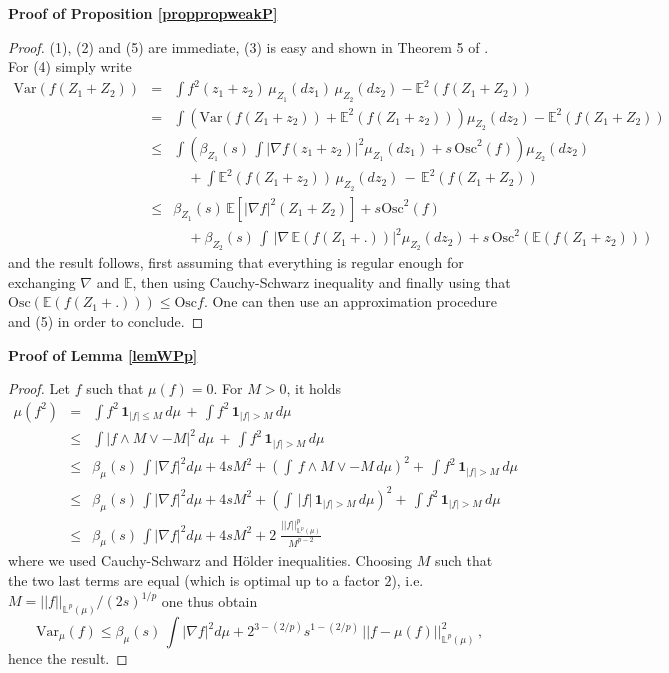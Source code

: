 \documentclass[11pt,reqno]{amsart}
\numberwithin{equation}{section}
\theoremstyle{definition}
\theoremstyle{remark}
\def \Var {\textrm{Var}}
\def \Osc {\textrm{Osc}}
\begin{document}
\textbf{Proof of Proposition \ref{proppropweakP}}
\begin{proof}
(1), (2) and (5) are immediate, (3) is easy and shown in Theorem 5 of \cite{BCR2}. For (4) simply write
\begin{eqnarray*}
\Var (f(Z_1+Z_2)) &=& \int f^2(z_1+z_2) \, \mu_{Z_1}(dz_1) \, \mu_{Z_2}(dz_2) - \mathbb E^2(f(Z_1+Z_2)) \\ &=&  \int \left(\Var (f(Z_1+z_2)) + \mathbb E^2(f(Z_1+z_2))\right) \mu_{Z_2}(dz_2) - \mathbb E^2(f(Z_1+Z_2))\\&\leq& \int \left(\beta_{Z_1}(s) \, \int |\nabla f(z_1+z_2)|^2 \mu_{Z_1}(dz_1) + s \, \Osc^2(f)\right) \mu_{Z_2}(dz_2) \\ && \quad + \int \mathbb E^2(f(Z_1+z_2)) \, \mu_{Z_2}(dz_2) \, - \, \mathbb E^2(f(Z_1+Z_2))\\ &\leq& \beta_{Z_1}(s) \, \mathbb E[|\nabla f|^2(Z_1+Z_2)] + s \Osc^2(f)  \\ && \quad + \beta_{Z_2}(s) \, \int \, |\nabla \, \mathbb E(f(Z_1+.))|^2 \mu_{Z_2}(dz_2) + s \, \Osc^2(\mathbb E(f(Z_1+z_2)))
\end{eqnarray*}
and the result follows, first assuming that everything is regular enough for exchanging $\nabla$ and $\mathbb E$, then using Cauchy-Schwarz inequality and finally using that $\Osc(\mathbb E(f(Z_1+.))) \leq \Osc f$. One can then use an approximation procedure and (5) in order to conclude.
\end{proof}


\noindent \textbf{Proof of Lemma \ref{lemWPp}}
\begin{proof}
Let $f$ such that $\mu(f)=0$. For $M>0$, it holds 
\begin{eqnarray*}
\mu(f^2) &=& \int f^2 \, \mathbf 1_{|f|\leq M} \, d\mu \, + \, \int f^2 \, \mathbf 1_{|f|> M} \, d\mu \\ &\leq& \int |f\wedge M\vee -M|^2  \, d\mu \, + \, \int f^2 \, \mathbf 1_{|f|> M} \, d\mu \\ &\leq& \beta_\mu(s) \, \int |\nabla f|^2 d\mu + 4sM^2 + \left(\int \, f\wedge M\vee -M \, d\mu\right)^2 + \, \int f^2 \, \mathbf 1_{|f|> M} \, d\mu \\ &\leq& \beta_\mu(s) \, \int |\nabla f|^2 d\mu + 4sM^2 + \left(\int \, |f| \, \mathbf 1_{|f|> M} \, d\mu\right)^2 + \, \int f^2 \, \mathbf 1_{|f|> M} \, d\mu \\&\leq& \beta_\mu(s) \, \int |\nabla f|^2 d\mu + 4sM^2 + 2 \; \frac{||f||^{p}_{\mathbb L^p(\mu)}}{M^{p-2}}
\end{eqnarray*}
where we used Cauchy-Schwarz and H\"{o}lder inequalities. Choosing $M$ such that the two last terms are equal (which is optimal up to a factor $2$), i.e. $M=||f||_{\mathbb L^p(\mu)}/(2s)^{1/p}$ one thus obtain $$\Var_\mu(f) \leq \beta_\mu(s) \, \int |\nabla f|^2 d\mu + 2^{{3}-(2/p)} s^{1-(2/p)} \, ||f - \mu(f)||^2_{\mathbb L^p(\mu)} \, ,$$ hence the result.
\end{proof}
\end{document}
